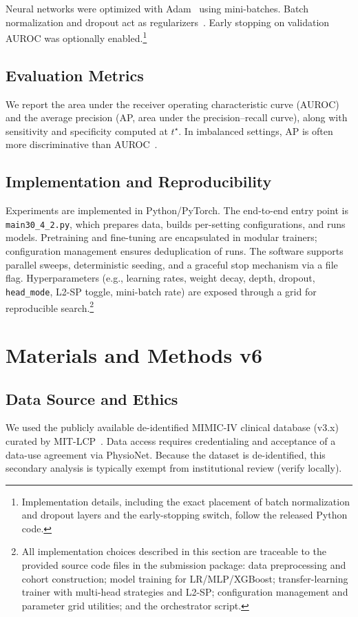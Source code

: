 \documentclass[journal,article,submit,pdftex,moreauthors]{Definitions/mdpi}
\begin{document}
Neural networks were optimized with Adam~\citep{Kingma2015_Adam} using mini-batches. Batch normalization and dropout act as regularizers~\citep{Ioffe2015_BN,Srivastava2014_Dropout}. Early stopping on validation AUROC was optionally enabled.\footnote{Implementation details, including the exact placement of batch normalization and dropout layers and the early-stopping switch, follow the released Python code.}

\subsection{Evaluation Metrics}

We report the area under the receiver operating characteristic curve (AUROC) and the average precision (AP, area under the precision--recall curve), along with sensitivity and specificity computed at $t^\star$. In imbalanced settings, AP is often more discriminative than AUROC~\citep{Saito2015_PR}.

\subsection{Implementation and Reproducibility}

Experiments are implemented in Python/PyTorch. The end-to-end entry point is \texttt{main30\_4\_2.py}, which prepares data, builds per-setting configurations, and runs models. Pretraining and fine-tuning are encapsulated in modular trainers; configuration management ensures deduplication of runs. The software supports parallel sweeps, deterministic seeding, and a graceful stop mechanism via a file flag. Hyperparameters (e.g., learning rates, weight decay, depth, dropout, \texttt{head\_mode}, L2-SP toggle, mini-batch rate) are exposed through a grid for reproducible search.\footnote{All implementation choices described in this section are traceable to the provided source code files in the submission package: data preprocessing and cohort construction; model training for LR/MLP/XGBoost; transfer-learning trainer with multi-head strategies and L2-SP; configuration management and parameter grid utilities; and the orchestrator script.}





\section{Materials and Methods v6}

\subsection{Data Source and Ethics}
We used the publicly available de-identified MIMIC-IV clinical database (v3.x) curated by MIT-LCP~\citep{Johnson2023_MIMICIV}. Data access requires credentialing and acceptance of a data-use agreement via PhysioNet. Because the dataset is de-identified, this secondary analysis is typically exempt from institutional review (verify locally).
\end{document}
